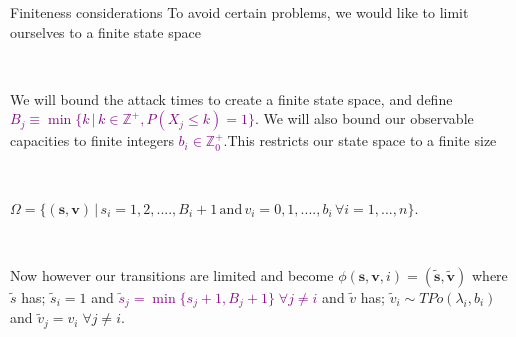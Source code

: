 \documentclass[10pt]{beamer}
\begin{document}
\begin{frame}{Finiteness considerations}
To avoid certain problems, we would like to limit ourselves to a finite state space

\

We will bound the attack times to create a finite state space, and define \textcolor{purple}{$B_{j} \equiv \min \{ k \, | \, k \in \mathbb{Z}^{+} , P(X_{j} \leq k)=1 \}$}. We will also bound our observable capacities to finite integers \textcolor{purple}{$b_{i} \in \mathbb{Z}^{+}_{0}$}.This restricts our state space to a finite size

\

$\Omega=\{(\bm{s},\bm{v}) \, | \, s_{i}=1,2,....,B_{i}+1 \, \text{and}  \, v_{i}=0,1,....,b_{i} \, \forall i=1,...,n  \}$.

\
\pause

Now however our transitions are limited and become $\phi(\bm{s},\bm{v},i)=(\widetilde{\bm{s}},\widetilde{\bm{v}})$ where $\widetilde{s}$ has; $\widetilde{s}_{i}=1$ and \textcolor{purple}{$\widetilde{s}_{j}=\min \{s_{j}+1,B_{j}+1 \} \; \forall j \neq i$} and $\widetilde{v}$ has; $\widetilde{v}_{i} \sim TPo(\lambda_{i},b_{i})$ and  $\widetilde{v}_{j}=v_{i} \; \forall j \neq i$.

\end{frame}
\end{document}
